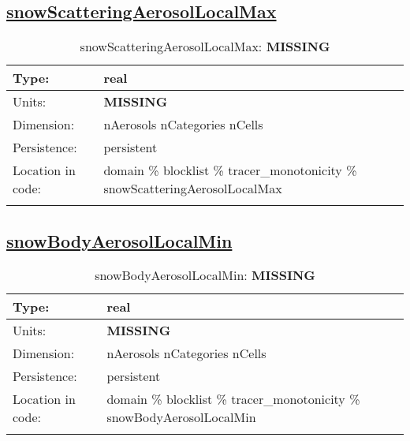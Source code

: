 \subsection[snowScatteringAerosolLocalMax]{\hyperref[sec:var_tab_tracer_monotonicity]{snowScatteringAerosolLocalMax}}
\label{subsec:var_sec_tracer_monotonicity_snowScatteringAerosolLocalMax}
\begin{center}
\begin{longtable}{| p{2.0in} | p{4.0in} |}
        \hline 
        Type: & real \\
        \hline 
        Units: & {\bf \color{red} MISSING} \\
        \hline 
        Dimension: & nAerosols nCategories nCells \\
        \hline 
        Persistence: & persistent \\
        \hline 
         Location in code: & domain \% blocklist \% tracer\_monotonicity \% snowScatteringAerosolLocalMax \\
         \hline 
    \caption{snowScatteringAerosolLocalMax: {\bf \color{red} MISSING}}
\end{longtable}
\end{center}
\subsection[snowBodyAerosolLocalMin]{\hyperref[sec:var_tab_tracer_monotonicity]{snowBodyAerosolLocalMin}}
\label{subsec:var_sec_tracer_monotonicity_snowBodyAerosolLocalMin}
\begin{center}
\begin{longtable}{| p{2.0in} | p{4.0in} |}
        \hline 
        Type: & real \\
        \hline 
        Units: & {\bf \color{red} MISSING} \\
        \hline 
        Dimension: & nAerosols nCategories nCells \\
        \hline 
        Persistence: & persistent \\
        \hline 
         Location in code: & domain \% blocklist \% tracer\_monotonicity \% snowBodyAerosolLocalMin \\
         \hline 
    \caption{snowBodyAerosolLocalMin: {\bf \color{red} MISSING}}
\end{longtable}
\end{center}
